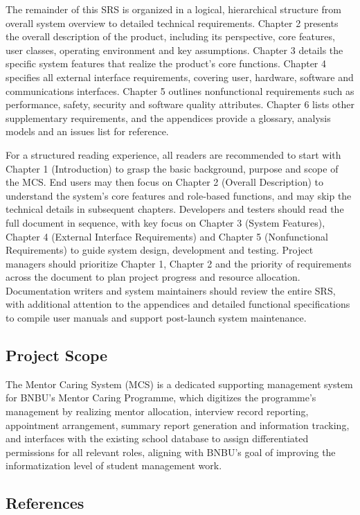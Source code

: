 \documentclass[a4paper,12pt]{article}
\begin{document}
The remainder of this SRS is organized in a logical, hierarchical structure from overall system overview to detailed technical requirements. Chapter 2 presents the overall description of the product, including its perspective, core features, user classes, operating environment and key assumptions. Chapter 3 details the specific system features that realize the product's core functions. Chapter 4 specifies all external interface requirements, covering user, hardware, software and communications interfaces. Chapter 5 outlines nonfunctional requirements such as performance, safety, security and software quality attributes. Chapter 6 lists other supplementary requirements, and the appendices provide a glossary, analysis models and an issues list for reference.

For a structured reading experience, all readers are recommended to start with Chapter 1 (Introduction) to grasp the basic background, purpose and scope of the MCS. End users may then focus on Chapter 2 (Overall Description) to understand the system's core features and role-based functions, and may skip the technical details in subsequent chapters. Developers and testers should read the full document in sequence, with key focus on Chapter 3 (System Features), Chapter 4 (External Interface Requirements) and Chapter 5 (Nonfunctional Requirements) to guide system design, development and testing. Project managers should prioritize Chapter 1, Chapter 2 and the priority of requirements across the document to plan project progress and resource allocation. Documentation writers and system maintainers should review the entire SRS, with additional attention to the appendices and detailed functional specifications to compile user manuals and support post-launch system maintenance.

\subsection{Project Scope}

The Mentor Caring System (MCS) is a dedicated supporting management system for BNBU's Mentor Caring Programme, which digitizes the programme's management by realizing mentor allocation, interview record reporting, appointment arrangement, summary report generation and information tracking, and interfaces with the existing school database to assign differentiated permissions for all relevant roles, aligning with BNBU's goal of improving the informatization level of student management work.

\subsection{References}
\end{document}
